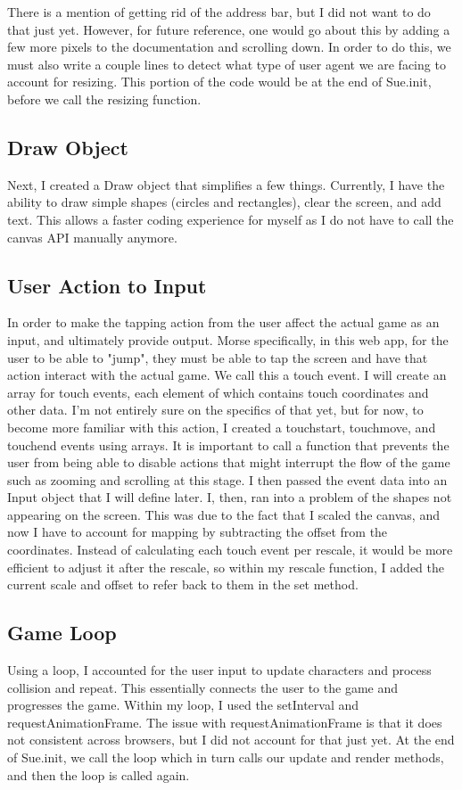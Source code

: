 \documentclass[10pt,twocolumn]{article}
\begin{document}
There is a mention of getting rid of the address bar, but I did not want to do that just yet. However, for future reference, one would go about this by adding a few more pixels to the documentation and scrolling down. In order to do this, we must also write a couple lines to detect what type of user agent we are facing to account for resizing. This portion of the code would be at the end of Sue.init, before we call the resizing function.

\subsection{Draw Object}
Next, I created a Draw object that simplifies a few things. Currently, I have the ability to draw simple shapes (circles and rectangles), clear the screen, and add text. This allows a faster coding experience for myself as I do not have to call the canvas API manually anymore. 

\subsection{User Action to Input}
In order to make the tapping action from the user affect the actual game as an input, and ultimately provide output. Morse specifically, in this web app, for the user to be able to "jump", they must be able to tap the screen and have that action interact with the actual game. We call this a touch event. I will create an array for touch events, each element of which contains touch coordinates and other data. I'm not entirely sure on the specifics of that yet, but for now, to become more familiar with this action, I created a touchstart, touchmove, and touchend events using arrays. It is important to call a function that prevents the user from being able to disable actions that might interrupt the flow of the game such as zooming and scrolling at this stage. I then passed the event data into an Input object that I will define later. 
I, then, ran into a problem of the shapes not appearing on the screen. This was due to the fact that I scaled the canvas, and now I have to account for mapping by subtracting the offset from the coordinates. Instead of calculating each touch event per rescale, it would be more efficient to adjust it after the rescale, so within my rescale function, I added the current scale and offset to refer back to them in the set method. 
 
\subsection{Game Loop}
Using a loop, I accounted for the user input to update characters and process collision and repeat. This essentially connects the user to the game and progresses the game. Within my loop, I used the setInterval and requestAnimationFrame. The issue with requestAnimationFrame is that it does not consistent across browsers, but I did not account for that just yet. 
At the end of Sue.init, we call the loop which in turn calls our update and render methods, and then the loop is called again. 
\end{document}
